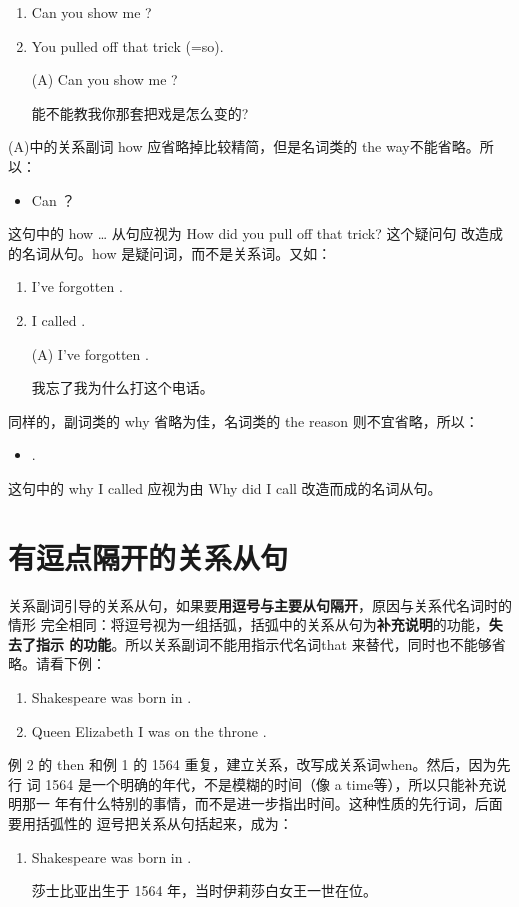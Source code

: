 \begin{enumerate}
\item Can you show me ?
\item You pulled off that trick  (=so).

  \reitem (A) Can you show me  ?

  能不能教我你那套把戏是怎么变的?
\end{enumerate}
(A)中的关系副词 how 应省略掉比较精简，但是名词类的 the way不能省略。所以：
\begin{itemize}
\item Can    ？
\end{itemize}
这句中的 how \ldots{} 从句应视为 How did you pull off that trick? 这个疑问句
改造成的名词从句。how 是疑问词，而不是关系词。又如：
\begin{enumerate}
\item I've forgotten .
\item I called .

  \reitem (A) I've forgotten   .

  我忘了我为什么打这个电话。
\end{enumerate}

同样的，副词类的 why 省略为佳，名词类的 the reason 则不宜省略，所以：
\begin{itemize}
\item {} .
\end{itemize}
这句中的 why I called 应视为由 Why did I call 改造而成的名词从句。

\section{有逗点隔开的关系从句}

关系副词引导的关系从句，如果要\textbf{用逗号与主要从句隔开}，原因与关系代名词时的情形
完全相同：将逗号视为一组括弧，括弧中的关系从句为\textbf{补充说明}的功能，\textbf{失去了指示
的功能}。所以关系副词不能用指示代名词that 来替代，同时也不能够省略。请看下例：

\begin{enumerate}
\item Shakespeare was born in .
\item Queen Elizabeth I was on the throne  .
\end{enumerate}
例 2 的 then 和例 1 的 1564 重复，建立关系，改写成关系词when。然后，因为先行
词 1564 是一个明确的年代，不是模糊的时间（像 a time等），所以只能补充说明那一
年有什么特别的事情，而不是进一步指出时间。这种性质的先行词，后面要用括弧性的
逗号把关系从句括起来，成为：
\begin{enumerate}[resume]
\item Shakespeare was born in  .

  莎士比亚出生于 1564 年，当时伊莉莎白女王一世在位。
\end{enumerate}

